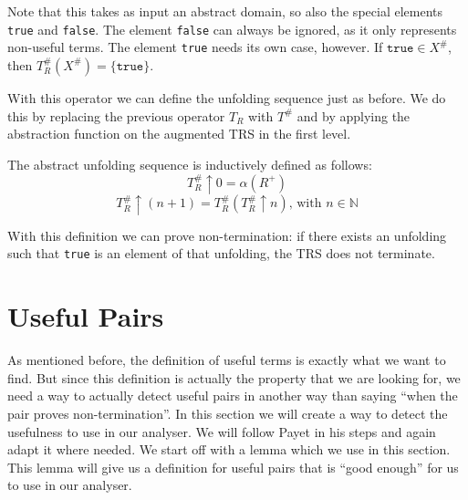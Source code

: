 \begin{definition}
\end{definition}
\begin{center}
\end{center}

Note that this takes as input an abstract domain, so also the special elements \texttt{true} and \texttt{false}. The element \texttt{false} can always be ignored, as it only represents non-useful terms. The element \texttt{true} needs its own case, however. If $\texttt{true} \in X^{\#}$, then $T_R^{\#}(X^{\#}) = \{ \texttt{true} \}$. 

With this operator we can define the unfolding sequence just as before. We do this by replacing the previous operator $T_R$ with $T^{\#}$ and by applying the abstraction function on the augmented TRS in the first level. 
\begin{definition}
The abstract unfolding sequence is inductively defined as follows:
$$T^{\#}_R \uparrow 0 = \alpha(R^+)$$
$$T^{\#}_R \uparrow (n+1) = T^{\#}_R(T^{\#}_R \uparrow n)\text{, with }n \in \mathbb{N}$$ 
\end{definition}

With this definition we can prove non-termination: if there exists an unfolding such that \texttt{true} is an element of that unfolding, the TRS does not terminate. 

\section*{Useful Pairs}
As mentioned before, the definition of useful terms is exactly what we want to find. But since this definition is actually the property that we are looking for, we need a way to actually detect useful pairs in another way than saying ``when the pair proves non-termination''. In this section we will create a way to detect the usefulness to use in our analyser. We will follow Payet in his steps and again adapt it where needed. We start off with a lemma which we use in this section. This lemma will give us a definition for useful pairs that is ``good enough'' for us to use in our analyser. 

